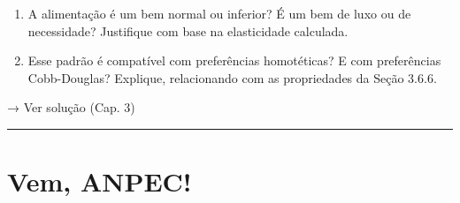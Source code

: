 \documentclass[11pt,twoside,openright]{book}
\begin{document}
\begin{enumerate}
\def\labelenumi{(\alph{enumi})}
\setcounter{enumi}{1}
\item
  A alimentação é um bem normal ou inferior? É um bem de luxo ou de
  necessidade? Justifique com base na elasticidade calculada.
\item
  Esse padrão é compatível com preferências homotéticas? E com
  preferências Cobb-Douglas? Explique, relacionando com as propriedades
  da Seção 3.6.6.
\end{enumerate}

→ Ver solução (Cap. 3)

\begin{center}\rule{0.5\linewidth}{0.5pt}\end{center}

\section{Vem, ANPEC!}\label{vem-anpec}
\end{document}

